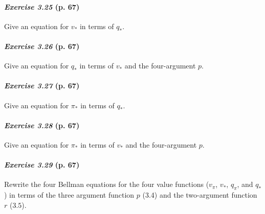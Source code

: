 \documentclass[10pt,a4paper]{article}
\begin{document}
\paragraph{\textit{Exercise 3.25} (p. 67)} Give an equation for $v_*$ in terms of $q_*$.

\paragraph{\textit{Exercise 3.26} (p. 67)} Give an equation for $q_*$ in terms of $v_*$ and the four-argument $p$.

\paragraph{\textit{Exercise 3.27} (p. 67)} Give an equation for $\pi_*$ in terms of $q_*$.

\paragraph{\textit{Exercise 3.28} (p. 67)} Give an equation for $\pi_*$ in terms of $v_*$ and the four-argument $p$.

\paragraph{\textit{Exercise 3.29} (p. 67)} Rewrite the four Bellman equations for the four value functions ($v_\pi$, $v_*$, $q_\pi$,
and $q_*$) in terms of the three argument function $p$ (3.4) and the two-argument function $r$
($3.5$).
\end{document}
